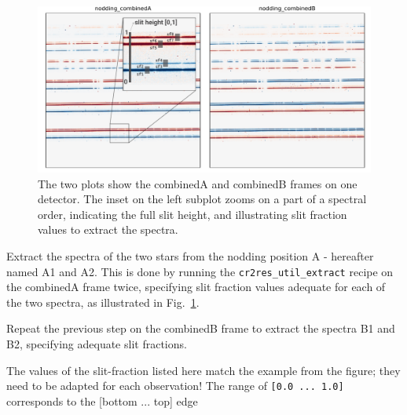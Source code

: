 \begin{shell}[fontsize=\small]
\end{shell}

\begin{figure}[!h]
  \begin{center}
    \includegraphics[width=1\textwidth]{figures/binary-nodding-combined}
  \end{center}
  \caption{
    \label{fig:binary-nodding}
    The two plots show the combinedA and combinedB frames
    on one detector. The inset on the left subplot zooms on a part of a
    spectral order, indicating the full slit height, 
    and illustrating slit fraction values to extract the spectra.}
\end{figure}

Extract the spectra of the two stars from the nodding position A -
hereafter named A1 and A2. This is done by running the \verb!cr2res_util_extract!
recipe on the combinedA frame twice, specifying slit fraction values adequate
for each of the two spectra, as illustrated in Fig.~\ref{fig:binary-nodding}.

Repeat the previous step on the combinedB frame to extract the spectra
B1 and B2, specifying adequate slit fractions.

\begin{shell}[fontsize=\small]
\end{shell}

The values of the slit-fraction listed here match the example from the figure;
they need to be adapted for each observation! The range of \verb![0.0 ... 1.0]!
corresponds to the [bottom ... top] edge 

